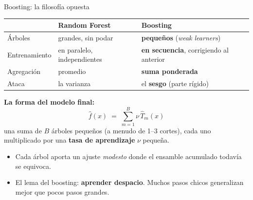 \documentclass{beamer}
\newcommand{\1}{\mathbb{I}}
\begin{document}
\begin{frame}{Boosting: la filosofía opuesta}
\small
\begin{center}
\footnotesize
\setlength{\tabcolsep}{4pt}
\begin{tabular}{lll}
\hline
 & Random Forest & Boosting \\
\hline
Árboles & grandes, sin podar & \textbf{pequeños} (\emph{weak learners}) \\
Entrenamiento & en paralelo, independientes & \textbf{en secuencia}, corrigiendo al anterior \\
Agregación & promedio & \textbf{suma ponderada} \\
Ataca & la varianza & el \textbf{sesgo} (parte rígido) \\
\hline
\end{tabular}
\end{center}
\pause

\vspace{0.25cm}
\textbf{La forma del modelo final:}
\[ \hat{f}(x) \;=\; \sum_{m=1}^{B} \nu \, \hat{T}_m(x) \]
una suma de $B$ árboles pequeños (a menudo de 1--3 cortes), cada uno multiplicado por una \textbf{tasa de aprendizaje} $\nu$ pequeña.
\pause

\vspace{0.15cm}
\begin{itemize}\itemsep3pt
  \item Cada árbol aporta un ajuste \emph{modesto} donde el ensamble acumulado todavía se equivoca.
  \item El lema del boosting: \textbf{aprender despacio}. Muchos pasos chicos generalizan mejor que pocos pasos grandes.
\end{itemize}
\end{frame}
\end{document}
